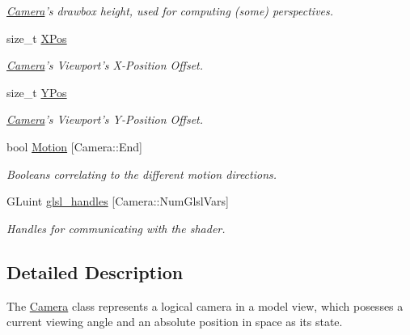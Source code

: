 \begin{DoxyCompactItemize}
\begin{DoxyCompactList}\small\item\em \hyperlink{class_camera}{Camera}'s drawbox height, used for computing (some) perspectives. \end{DoxyCompactList}\item 
\hypertarget{class_camera_a2e2fc28fcaa8222ac635a568950e6af3}{size\-\_\-t \hyperlink{class_camera_a2e2fc28fcaa8222ac635a568950e6af3}{X\-Pos}}\label{class_camera_a2e2fc28fcaa8222ac635a568950e6af3}

\begin{DoxyCompactList}\small\item\em \hyperlink{class_camera}{Camera}'s Viewport's X-\/\-Position Offset. \end{DoxyCompactList}\item 
\hypertarget{class_camera_af15974390620818974704b6e88cfedbd}{size\-\_\-t \hyperlink{class_camera_af15974390620818974704b6e88cfedbd}{Y\-Pos}}\label{class_camera_af15974390620818974704b6e88cfedbd}

\begin{DoxyCompactList}\small\item\em \hyperlink{class_camera}{Camera}'s Viewport's Y-\/\-Position Offset. \end{DoxyCompactList}\item 
bool \hyperlink{class_camera_a39746b4fadf30bba6bdc8aa6acfdc6f2}{Motion} \mbox{[}Camera\-::\-End\mbox{]}
\begin{DoxyCompactList}\small\item\em Booleans correlating to the different motion directions. \end{DoxyCompactList}\item 
G\-Luint \hyperlink{class_camera_a1635486d7f9e0d52b241899a270ee335}{glsl\-\_\-handles} \mbox{[}Camera\-::\-Num\-Glsl\-Vars\mbox{]}
\begin{DoxyCompactList}\small\item\em Handles for communicating with the shader. \end{DoxyCompactList}\end{DoxyCompactItemize}


\subsection{Detailed Description}
The \hyperlink{class_camera}{Camera} class represents a logical camera in a model view, which posesses a current viewing angle and an absolute position in space as its state. 

